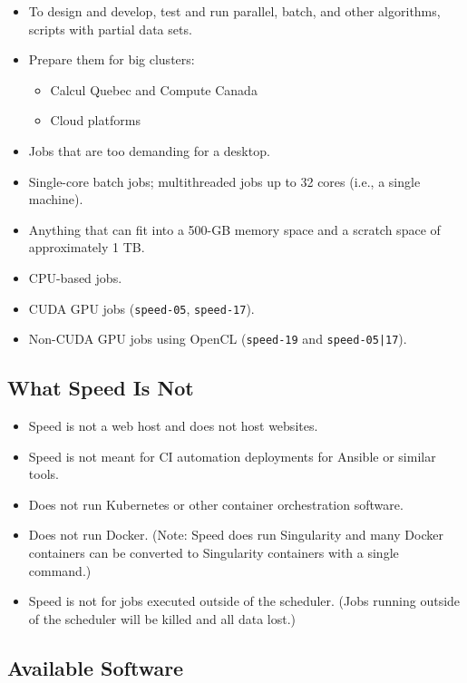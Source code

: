 \documentclass{easychair}
\begin{document}
\begin{itemize}
\item
To design and develop, test and run parallel, batch, and other algorithms, scripts with partial data sets.
\item
Prepare them for big clusters:
	\begin{itemize}
	\item 
	Calcul Quebec and Compute Canada
	\item 
	Cloud platforms
	\end{itemize}
\item
Jobs that are too demanding for a desktop. 
\item
Single-core batch jobs; multithreaded jobs up to 32 cores (i.e., a single machine).
\item
Anything that can fit into a 500-GB memory space and a scratch space of approximately 1 TB. 
\item
CPU-based jobs. 
\item
CUDA GPU jobs (\texttt{speed-05}, \texttt{speed-17}).
\item
Non-CUDA GPU jobs using OpenCL (\texttt{speed-19} and \texttt{speed-05|17}).
\end{itemize}

\subsection{What Speed Is Not}
\label{sect:speed-is-not}

\begin{itemize}
\item Speed is not a web host and does not host websites.
\item Speed is not meant for CI automation deployments for Ansible or similar tools. 
\item Does not run Kubernetes or other container orchestration software.
\item Does not run Docker. (Note: Speed does run Singularity and many Docker containers can be converted to Singularity containers with a single command.)
\item Speed is not for jobs executed outside of the scheduler. (Jobs running outside of the scheduler will be killed and all data lost.)
\end{itemize}

\subsection{Available Software}
\end{document}
